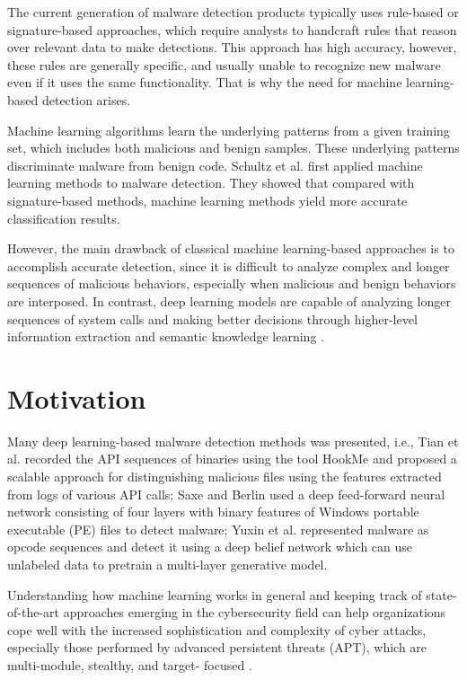 \documentclass[12pt, a4paper]{article}
\begin{document}
The current generation of malware detection products typically uses rule-based or signature-based approaches, which require analysts to handcraft rules that reason over relevant data to make detections. This approach has high accuracy, however, these rules are generally specific, and usually unable to recognize new malware even if it uses the same functionality. That is why the need for machine learning-based detection arises.

Machine learning algorithms learn the underlying patterns from a given training set, which includes both malicious and benign samples. These underlying patterns discriminate malware from benign code. Schultz et al. \cite{Schultz:2001:DMM:882495.884439} first applied machine learning methods to malware detection. They showed that compared with signature-based methods, machine learning methods yield more accurate classification results. 

However, the main drawback of classical machine learning-based approaches is to accomplish accurate detection, since it is difficult to analyze complex and longer sequences of malicious behaviors, especially when malicious and benign behaviors are interposed. In contrast, deep learning models are capable of analyzing longer sequences of system calls and making better decisions through higher-level information extraction and semantic knowledge learning \cite{7946997}.

\section*{Motivation}

Many deep learning-based malware detection methods was presented, i.e., Tian et al. \cite{5665796} recorded the API sequences of binaries using the tool HookMe and proposed a scalable approach for distinguishing malicious files using the features extracted from logs of various API calls; Saxe and Berlin \cite{DBLP:journals/corr/SaxeB15} used a deep feed-forward neural network consisting of four layers with binary features of Windows portable executable (PE) files to detect malware; Yuxin et al. \cite{Yuxin2017MalwareDB} represented malware as opcode sequences and detect it using a deep belief network which can use unlabeled data to pretrain a multi-layer generative model.

Understanding how machine learning works in general and keeping track of state-of-the-art approaches emerging in the cybersecurity field can help organizations cope well with the increased sophistication and complexity of cyber attacks, especially those performed by advanced persistent threats (APT), which are multi-module, stealthy, and target- focused \cite{7946997}.
\end{document}
